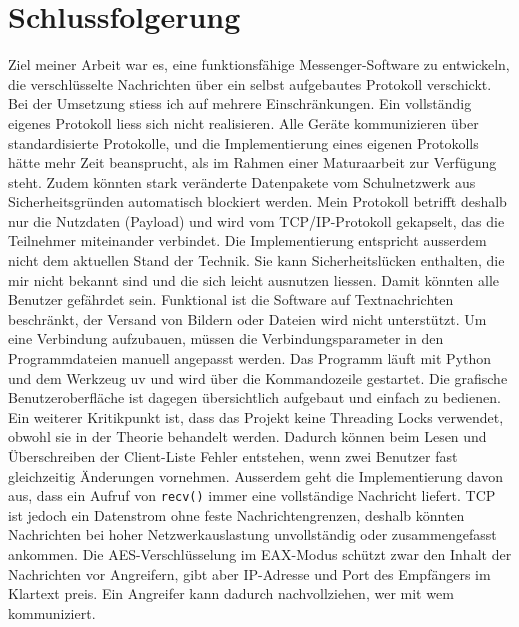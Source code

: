 \chapter{Schlussfolgerung}
\label{chap:Schlussfolgerung}
Ziel meiner Arbeit war es, eine funktionsfähige Messenger-Software zu entwickeln, die verschlüsselte Nachrichten über ein selbst aufgebautes Protokoll verschickt. Bei der Umsetzung stiess ich auf mehrere Einschränkungen.
Ein vollständig eigenes Protokoll liess sich nicht realisieren. Alle Geräte kommunizieren über standardisierte Protokolle, und die Implementierung eines eigenen Protokolls hätte mehr Zeit beansprucht, als im Rahmen einer Maturaarbeit zur Verfügung steht. Zudem könnten stark veränderte Datenpakete vom Schulnetzwerk aus Sicherheitsgründen automatisch blockiert werden. Mein Protokoll betrifft deshalb nur die Nutzdaten (Payload) und wird vom TCP/IP-Protokoll gekapselt, das die Teilnehmer miteinander verbindet.
Die Implementierung entspricht ausserdem nicht dem aktuellen Stand der Technik. Sie kann Sicherheitslücken enthalten, die mir nicht bekannt sind und die sich leicht ausnutzen liessen. Damit könnten alle Benutzer gefährdet sein.
Funktional ist die Software auf Textnachrichten beschränkt, der Versand von Bildern oder Dateien wird nicht unterstützt. Um eine Verbindung aufzubauen, müssen die Verbindungsparameter in den Programmdateien manuell angepasst werden. Das Programm läuft mit Python und dem Werkzeug uv und wird über die Kommandozeile gestartet. Die grafische Benutzeroberfläche ist dagegen übersichtlich aufgebaut und einfach zu bedienen.
Ein weiterer Kritikpunkt ist, dass das Projekt keine Threading Locks verwendet, obwohl sie in der Theorie behandelt werden. Dadurch können beim Lesen und Überschreiben der Client-Liste Fehler entstehen, wenn zwei Benutzer fast gleichzeitig Änderungen vornehmen.
Ausserdem geht die Implementierung davon aus, dass ein Aufruf von \texttt{recv()} immer eine vollständige Nachricht liefert. TCP ist jedoch ein Datenstrom ohne feste Nachrichtengrenzen, deshalb könnten Nachrichten bei hoher Netzwerkauslastung unvollständig oder zusammengefasst ankommen.
Die AES-Verschlüsselung im EAX-Modus schützt zwar den Inhalt der Nachrichten vor Angreifern, gibt aber IP-Adresse und Port des Empfängers im Klartext preis. Ein Angreifer kann dadurch nachvollziehen, wer mit wem kommuniziert.